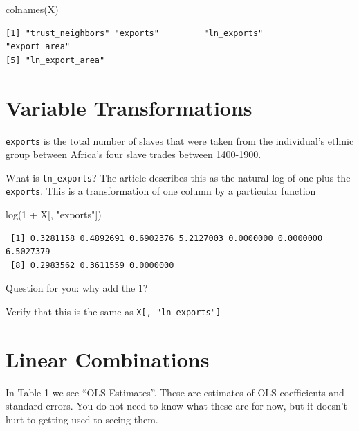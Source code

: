 \documentclass[
  letterpaper,
]{book}
\newenvironment{Shaded}{\begin{snugshade}}{\end{snugshade}}
\newcommand{\DecValTok}[1]{\textcolor[rgb]{0.68,0.00,0.00}{#1}}
\newcommand{\FunctionTok}[1]{\textcolor[rgb]{0.28,0.35,0.67}{#1}}
\newcommand{\NormalTok}[1]{\textcolor[rgb]{0.00,0.23,0.31}{#1}}
\newcommand{\SpecialCharTok}[1]{\textcolor[rgb]{0.37,0.37,0.37}{#1}}
\newcommand{\StringTok}[1]{\textcolor[rgb]{0.13,0.47,0.30}{#1}}
\theoremstyle{definition}
\theoremstyle{definition}
\theoremstyle{plain}
\theoremstyle{definition}
\theoremstyle{plain}
\theoremstyle{plain}
\theoremstyle{remark}
\begin{document}
\begin{Shaded}
\begin{Highlighting}[]
\FunctionTok{colnames}\NormalTok{(X)}
\end{Highlighting}
\end{Shaded}

\begin{verbatim}
[1] "trust_neighbors" "exports"         "ln_exports"      "export_area"    
[5] "ln_export_area" 
\end{verbatim}

\hypertarget{variable-transformations}{%
\section{Variable Transformations}\label{variable-transformations}}

\texttt{exports} is the total number of slaves that were taken from the
individual's ethnic group between Africa's four slave trades between
1400-1900.

What is \texttt{ln\_exports}? The article describes this as the natural
log of one plus the \texttt{exports}. This is a transformation of one
column by a particular function

\begin{Shaded}
\begin{Highlighting}[]
\FunctionTok{log}\NormalTok{(}\DecValTok{1} \SpecialCharTok{+}\NormalTok{ X[, }\StringTok{"exports"}\NormalTok{])}
\end{Highlighting}
\end{Shaded}

\begin{verbatim}
 [1] 0.3281158 0.4892691 0.6902376 5.2127003 0.0000000 0.0000000 6.5027379
 [8] 0.2983562 0.3611559 0.0000000
\end{verbatim}

Question for you: why add the 1?

Verify that this is the same as \texttt{X{[},\ "ln\_exports"{]}}

\hypertarget{linear-combinations}{%
\section{Linear Combinations}\label{linear-combinations}}

In Table 1 we see ``OLS Estimates''. These are estimates of OLS
coefficients and standard errors. You do not need to know what these are
for now, but it doesn't hurt to getting used to seeing them.
\end{document}
